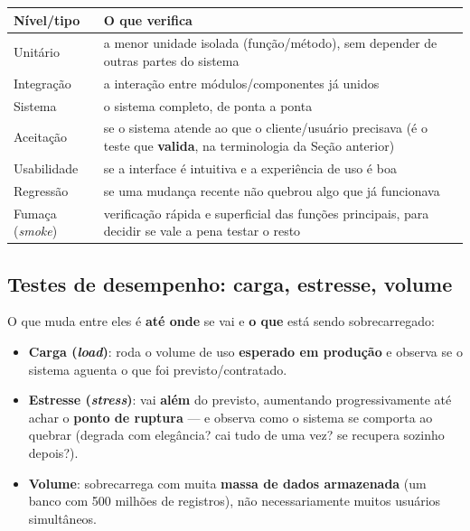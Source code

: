 \begin{conceito}
\begin{center}
\begin{tabular}{@{}p{3cm}p{9.2cm}@{}}
\toprule
\textbf{Nível/tipo} & \textbf{O que verifica} \\
\midrule
Unitário & a menor unidade isolada (função/método), sem depender de outras
partes do sistema \\
Integração & a interação entre módulos/componentes já unidos \\
Sistema & o sistema completo, de ponta a ponta \\
Aceitação & se o sistema atende ao que o cliente/usuário precisava (é o
teste que \textbf{valida}, na terminologia da Seção anterior) \\
Usabilidade & se a interface é intuitiva e a experiência de uso é boa \\
Regressão & se uma mudança recente não quebrou algo que já funcionava \\
Fumaça (\textit{smoke}) & verificação rápida e superficial das funções
principais, para decidir se vale a pena testar o resto \\
\bottomrule
\end{tabular}
\end{center}
\end{conceito}

\subsection{Testes de desempenho: carga, estresse, volume}

\begin{conceito}
O que muda entre eles é \textbf{até onde} se vai e \textbf{o que} está
sendo sobrecarregado:

\begin{itemize}
\item \textbf{Carga (\textit{load})}: roda o volume de uso \textbf{esperado
em produção} e observa se o sistema aguenta o que foi previsto/contratado.
\item \textbf{Estresse (\textit{stress})}: vai \textbf{além} do previsto,
aumentando progressivamente até achar o \textbf{ponto de ruptura} --- e
observa como o sistema se comporta ao quebrar (degrada com elegância? cai
tudo de uma vez? se recupera sozinho depois?).
\item \textbf{Volume}: sobrecarrega com muita \textbf{massa de dados
armazenada} (um banco com 500 milhões de registros), não necessariamente
muitos usuários simultâneos.
\end{itemize}
\end{conceito}

